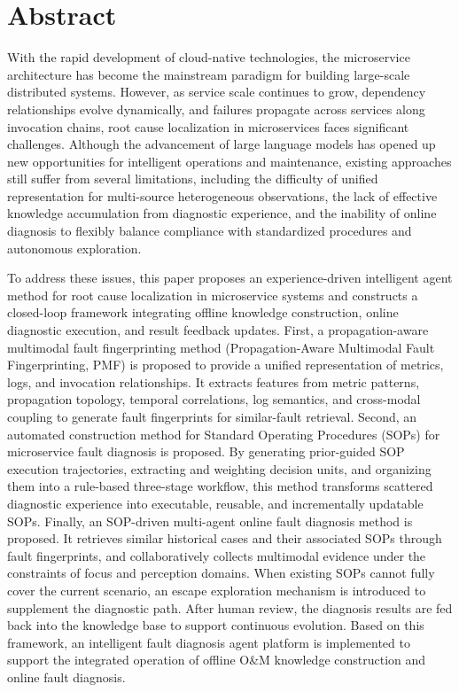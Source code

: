 \intobmk\chapter*{Abstract}%

With the rapid development of cloud-native technologies, the microservice architecture has become the mainstream paradigm for building large-scale distributed systems. However, as service scale continues to grow, dependency relationships evolve dynamically, and failures propagate across services along invocation chains, root cause localization in microservices faces significant challenges. Although the advancement of large language models has opened up new opportunities for intelligent operations and maintenance, existing approaches still suffer from several limitations, including the difficulty of unified representation for multi-source heterogeneous observations, the lack of effective knowledge accumulation from diagnostic experience, and the inability of online diagnosis to flexibly balance compliance with standardized procedures and autonomous exploration.

To address these issues, this paper proposes an experience-driven intelligent agent method for root cause localization in microservice systems and constructs a closed-loop framework integrating offline knowledge construction, online diagnostic execution, and result feedback updates. First, a propagation-aware multimodal fault fingerprinting method (Propagation-Aware Multimodal Fault Fingerprinting, PMF) is proposed to provide a unified representation of metrics, logs, and invocation relationships. It extracts features from metric patterns, propagation topology, temporal correlations, log semantics, and cross-modal coupling to generate fault fingerprints for similar-fault retrieval. Second, an automated construction method for Standard Operating Procedures (SOPs) for microservice fault diagnosis is proposed. By generating prior-guided SOP execution trajectories, extracting and weighting decision units, and organizing them into a rule-based three-stage workflow, this method transforms scattered diagnostic experience into executable, reusable, and incrementally updatable SOPs. Finally, an SOP-driven multi-agent online fault diagnosis method is proposed. It retrieves similar historical cases and their associated SOPs through fault fingerprints, and collaboratively collects multimodal evidence under the constraints of focus and perception domains. When existing SOPs cannot fully cover the current scenario, an escape exploration mechanism is introduced to supplement the diagnostic path. After human review, the diagnosis results are fed back into the knowledge base to support continuous evolution. Based on this framework, an intelligent fault diagnosis agent platform is implemented to support the integrated operation of offline O\&M knowledge construction and online fault diagnosis.

